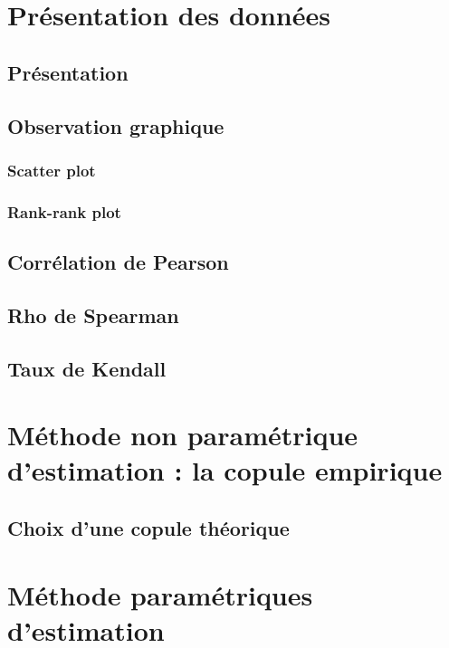 
\section{Présentation des données}
\subsection{Présentation}

\subsection{Observation graphique}

\subsubsection{Scatter plot}

\subsubsection{Rank-rank plot}

\subsection{Corrélation de Pearson}

\subsection{Rho de Spearman}

\subsection{Taux de Kendall}

\section{Méthode non paramétrique d'estimation : la copule empirique}
\subsection{Choix d'une copule théorique}


\section{Méthode paramétriques d'estimation}
